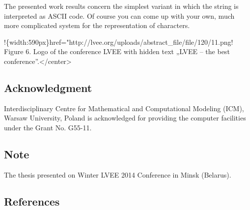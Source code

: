 \documentclass[10pt, a5paper]{article}
\begin{document}
The presented work results concern the simplest variant in which the string is interpreted as ASCII code. Of course you can come up with your own, much more complicated system for the representation of characters.

!\{width:590px\}href="http://lvee.org/uploads/abstract\_file/file/120/11.png!
Figure 6. Logo of the conference LVEE with hidden text „LVEE – the best conference”.</center>

\subsection*{Acknowledgment}

Interdisciplinary Centre for Mathematical and Computational Modeling (ICM), Warsaw University, Poland is acknowledged for providing the computer facilities under the Grant No. G55-11.

\subsection*{Note}

The thesis presented on Winter LVEE 2014 Conference in Minsk (Belarus).

\subsection*{References}
\end{document}
